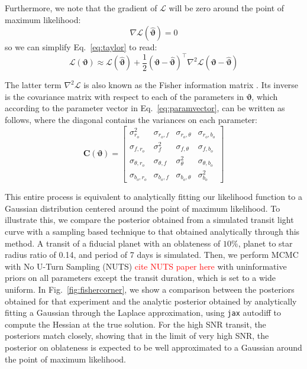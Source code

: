 \documentclass[twocolumn]{aastex631}
\begin{document}
Furthermore, we note that the gradient of $ \mathcal{L}$ will be zero around the point of maximum likelihood: 
\begin{equation}
    \nabla \mathcal{L}(\hat{\boldsymbol{\vartheta}}) = 0
\end{equation}
so we can simplify Eq.~\ref{eq:taylor} to read:
\begin{equation} \label{eq:taylor}
    \mathcal{L}(\boldsymbol{\vartheta}) \approx 
    \mathcal{L}(\hat{\boldsymbol{\vartheta}}) + \frac{1}{2}(\boldsymbol{\vartheta} - \hat{\boldsymbol{\vartheta}})^\top \nabla^2 \mathcal{L}(\boldsymbol{\vartheta} - \hat{\boldsymbol{\vartheta}})
\end{equation}

The latter term $\nabla^2 \mathcal{L}$ is also known as the Fisher information matrix \citep{fisher1922}. Its inverse is the covariance matrix with respect to each of the parameters in $\boldsymbol{\vartheta}$, which according to the parameter vector in Eq.~\ref{eq:paramvector}, can be written as follows, where the diagonal contains the variances on each parameter:
\begin{equation}
    \mathbf{C}(\boldsymbol{\vartheta}) = 
\begin{bmatrix}
\sigma_{r_o}^2 & \sigma_{r_o, f} & \sigma_{r_o, \theta} & \sigma_{r_o, b_o} \\
\sigma_{f, r_o} & \sigma_{f}^2 & \sigma_{f, \theta} & \sigma_{f, b_o} \\
\sigma_{\theta, r_o} & \sigma_{\theta, f} & \sigma_{\theta}^2 & \sigma_{\theta, b_o} \\
\sigma_{b_o, r_o} & \sigma_{b_o, f} & \sigma_{b_o, \theta} & \sigma_{b_o}^2
\end{bmatrix}
\end{equation}

This entire process is equivalent to analytically fitting our likelihood function to a Gaussian distribution centered around the point of maximum likelihood. To illustrate this, we compare the posterior obtained from a simulated transit light curve with a sampling based technique to that obtained analytically through this method. A transit of a fiducial planet with an oblateness of $10\%$, planet to star radius ratio of 0.14, and period of 7 days is simulated. Then, we perform MCMC with No U-Turn Sampling (NUTS) \textcolor{red}{cite NUTS paper here} with uninformative priors on all parameters except the transit duration, which is set to a wide uniform. In Fig.~\ref{fig:fishercorner}, we show a comparison between the posteriors obtained for that experiment and the analytic posterior obtained by analytically fitting a Gaussian through the Laplace approximation, using \texttt{jax} autodiff to compute the Hessian at the true solution. For the high SNR transit, the posteriors match closely, showing that in the limit of very high SNR, the posterior on oblateness is expected to be well approximated to a Gaussian around the point of maximum likelihood. 
\end{document}
